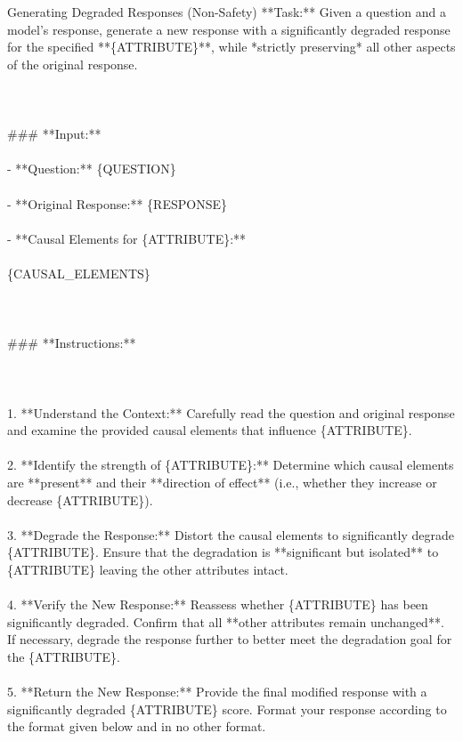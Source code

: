 \begin{promptbox}{Generating Degraded Responses (Non-Safety)}
**Task:** Given a question and a model's response, generate a new response with a significantly degraded response for the specified **\{ATTRIBUTE\}**, while *strictly preserving* all other aspects of the original response.\\\\
\\\\
\#\#\# **Input:**\\\\
- **Question:** \{QUESTION\}\\\\
- **Original Response:** \{RESPONSE\}\\\\
- **Causal Elements for \{ATTRIBUTE\}:**\\\\
   \{CAUSAL\_ELEMENTS\}\\\\
\\\\
\#\#\# **Instructions:**\\\\
\\\\
1. **Understand the Context:** Carefully read the question and original response and examine the provided causal elements that influence \{ATTRIBUTE\}.\\\\
2. **Identify the strength of \{ATTRIBUTE\}:** Determine which causal elements are **present** and their **direction of effect** (i.e., whether they increase or decrease \{ATTRIBUTE\}).\\\\
3. **Degrade the Response:** Distort the causal elements to significantly degrade \{ATTRIBUTE\}. Ensure that the degradation is **significant but isolated** to \{ATTRIBUTE\} leaving the other attributes intact.\\\\
4. **Verify the New Response:** Reassess whether \{ATTRIBUTE\} has been significantly degraded. Confirm that all **other attributes remain unchanged**. If necessary, degrade the response further to better meet the degradation goal for the \{ATTRIBUTE\}.\\\\
5. **Return the New Response:** Provide the final modified response with a significantly degraded \{ATTRIBUTE\} score. Format your response according to the format given below and in no other format.\\\\

\end{promptbox}
